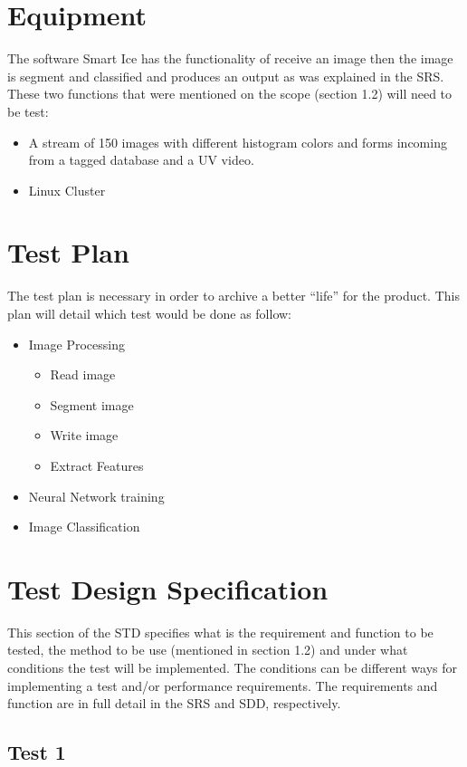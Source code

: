 \documentclass[12pt]{article}
\begin{document}
\section{Equipment}
The software Smart Ice has the functionality of receive an image then the image is segment and classified and produces an output as was explained in the SRS. These two functions that were mentioned on the scope (section 1.2) will need to be test:

\begin{itemize}
  \item A stream of 150 images with different histogram colors and forms incoming from a tagged database and a UV video.
  \item Linux Cluster
\end{itemize}

\section{Test Plan}
The test plan is necessary in order to archive a better “life” for the product. This plan will detail which test would be done as follow:

\begin{itemize}
  \item Image Processing
    \begin{itemize}
  \item Read image
  \item Segment image
  \item Write image
  \item Extract Features
    \end{itemize}
  \item Neural Network training
  \item Image Classification
\end{itemize}
\section{Test Design Specification}
This section of the STD specifies what is the requirement and function to be tested,  the method to be use (mentioned in section 1.2) and under what conditions the test will be implemented. The conditions can be different ways for implementing a test and/or performance requirements. The requirements and function are in full detail in the SRS and SDD, respectively.
\subsection{Test 1}
\end{document}
